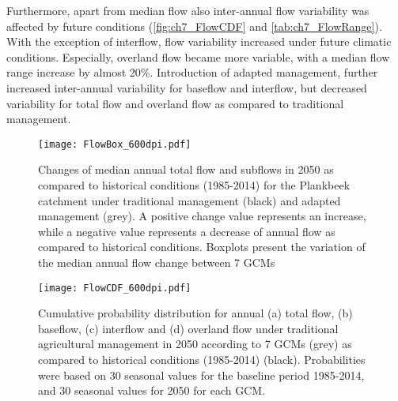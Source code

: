 Furthermore, apart from median flow also inter-annual flow variability was affected by future conditions (\autoref{fig:ch7_FlowCDF} and \autoref{tab:ch7_FlowRange}). With the exception of interflow, flow variability increased under future climatic conditions. Especially, overland flow became more variable, with a median flow range increase by almost 20\%. Introduction of adapted management, further increased inter-annual variability for baseflow and interflow, but decreased variability for total flow and overland flow as compared to traditional management.

\begin{figure}[tbhp]
	\centering
		\texttt{[image: FlowBox\_600dpi.pdf]}
	\caption{Changes of  median annual total flow and subflows in 2050 as compared to historical conditions (1985-2014) for the Plankbeek catchment under traditional management (black) and adapted management (grey). A positive change value represents an increase, while a negative value represents a decrease of annual flow as compared to historical conditions. Boxplots present the variation of the median annual flow change between 7 GCMs}
	\label{fig:ch7_FlowBox}
\end{figure}  

\begin{figure}[tbhp]
	\centering
		\texttt{[image: FlowCDF\_600dpi.pdf]}
	\caption{Cumulative probability distribution for annual (a) total flow, (b) baseflow, (c) interflow and (d) overland flow under traditional agricultural management in 2050 according to 7 GCMs (grey) as compared to historical conditions (1985-2014) (black). Probabilities were based on 30 seasonal values for the baseline period 1985-2014,  and 30 seasonal values for 2050 for each GCM.}
	\label{fig:ch7_FlowCDF}
\end{figure}   


